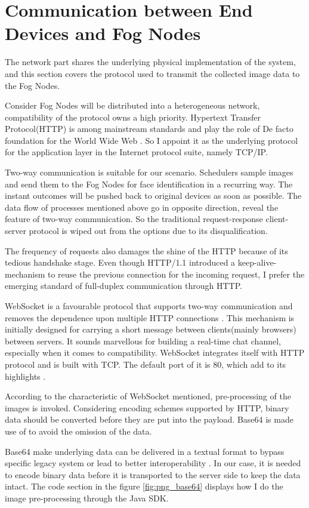 \section{Communication between End Devices and Fog Nodes}
The network part shares the underlying physical implementation of the system, and this section covers the protocol used to transmit the collected image data to the Fog Nodes.

Consider Fog Nodes will be distributed into a heterogeneous network, compatibility of the protocol owns a high priority. Hypertext Transfer Protocol(HTTP) is among mainstream standards and play the role of De facto foundation for the World Wide Web \cite{fielding1999hypertext}. So I appoint it as the underlying protocol for the application layer in the Internet protocol suite, namely TCP/IP.

Two-way communication is suitable for our scenario. Schedulers sample images and send them to the Fog Nodes for face identification in a recurring way. The instant outcomes will be pushed back to original devices as soon as possible. The data flow of processes mentioned above go in opposite direction, reveal the feature of two-way communication. So the traditional request-response client-server protocol is wiped out from the options due to its disqualification.

The frequency of requests also damages the shine of the HTTP because of its tedious handshake stage. Even though HTTP/1.1 introduced a keep-alive-mechanism to reuse the previous connection for the incoming request, I prefer the emerging standard of full-duplex communication through HTTP.

WebSocket is a favourable protocol that supports two-way communication and removes the dependence upon multiple HTTP connections  \cite{fette2011websocket}. This mechanism is initially designed for carrying a short message between clients(mainly browsers) between servers. It sounds marvellous for building a real-time chat channel, especially when it comes to compatibility. WebSocket integrates itself with HTTP protocol and is built with TCP. The default port of it is 80, which add to its highlights \cite{fette2011websocket}.

According to the characteristic of WebSocket mentioned, pre-processing of the images is invoked. Considering encoding schemes supported by HTTP, binary data should be converted before they are put into the payload. Base64 is made use of to avoid the omission of the data.

Base64 make underlying data can be delivered in a textual format to bypass specific legacy system or lead to better interoperability  \cite{josefsson2006base16}. In our case, it is needed to encode binary data before it is transported to the server side to keep the data intact. The code section in the figure \ref{fig:png_base64} displays how I do the image pre-processing through the Java SDK.

